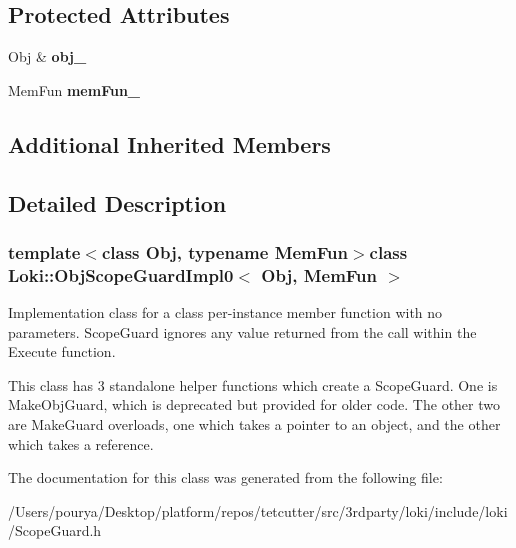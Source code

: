 \subsection*{Protected Attributes}
\begin{DoxyCompactItemize}
\item 
\hypertarget{classLoki_1_1ObjScopeGuardImpl0_a2847d28673078ad539701de2ecdda130}{}Obj \& {\bfseries obj\+\_\+}\label{classLoki_1_1ObjScopeGuardImpl0_a2847d28673078ad539701de2ecdda130}

\item 
\hypertarget{classLoki_1_1ObjScopeGuardImpl0_adaec41c63fc95ab8312bf170ff0757a0}{}Mem\+Fun {\bfseries mem\+Fun\+\_\+}\label{classLoki_1_1ObjScopeGuardImpl0_adaec41c63fc95ab8312bf170ff0757a0}

\end{DoxyCompactItemize}
\subsection*{Additional Inherited Members}


\subsection{Detailed Description}
\subsubsection*{template$<$class Obj, typename Mem\+Fun$>$class Loki\+::\+Obj\+Scope\+Guard\+Impl0$<$ Obj, Mem\+Fun $>$}

Implementation class for a class per-\/instance member function with no parameters. Scope\+Guard ignores any value returned from the call within the Execute function.

This class has 3 standalone helper functions which create a Scope\+Guard. One is Make\+Obj\+Guard, which is deprecated but provided for older code. The other two are Make\+Guard overloads, one which takes a pointer to an object, and the other which takes a reference. 

The documentation for this class was generated from the following file\+:\begin{DoxyCompactItemize}
\item 
/\+Users/pourya/\+Desktop/platform/repos/tetcutter/src/3rdparty/loki/include/loki/Scope\+Guard.\+h\end{DoxyCompactItemize}

